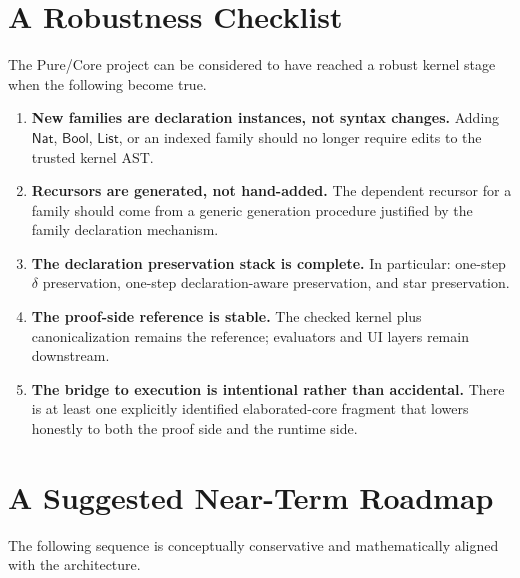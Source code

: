 \documentclass[11pt]{article}
\newcommand{\deltared}{\ensuremath{\delta}}
\newcommand{\Nat}{\ensuremath{\mathsf{Nat}}}
\newcommand{\Bool}{\ensuremath{\mathsf{Bool}}}
\newcommand{\ListTy}{\ensuremath{\mathsf{List}}}
\begin{document}
\section{A Robustness Checklist}

The Pure/Core project can be considered to have reached a robust kernel stage
when the following become true.

\begin{enumerate}[leftmargin=2em]
  \item \textbf{New families are declaration instances, not syntax changes.}
  Adding \Nat{}, \Bool{}, \ListTy{}, or an indexed family should no longer
  require edits to the trusted kernel AST.

  \item \textbf{Recursors are generated, not hand-added.}
  The dependent recursor for a family should come from a generic generation
  procedure justified by the family declaration mechanism.

  \item \textbf{The declaration preservation stack is complete.}
  In particular: one-step $\deltared$ preservation, one-step declaration-aware
  preservation, and star preservation.

  \item \textbf{The proof-side reference is stable.}
  The checked kernel plus canonicalization remains the reference; evaluators and
  UI layers remain downstream.

  \item \textbf{The bridge to execution is intentional rather than accidental.}
  There is at least one explicitly identified elaborated-core fragment that
  lowers honestly to both the proof side and the runtime side.
\end{enumerate}

\section{A Suggested Near-Term Roadmap}

The following sequence is conceptually conservative and mathematically aligned
with the architecture.
\end{document}
